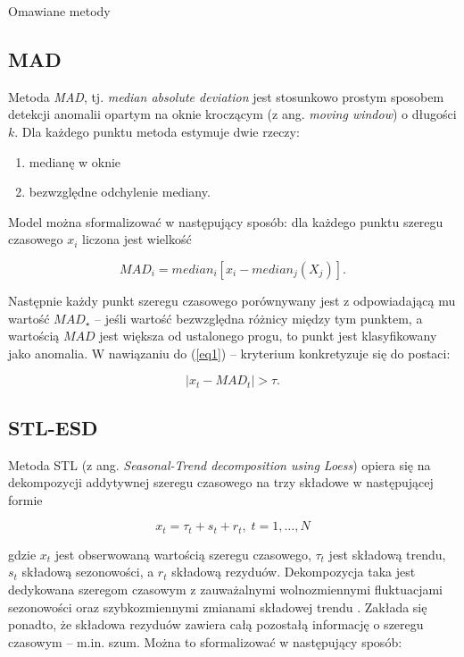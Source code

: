 \documentclass{article}
\begin{document}
Omawiane metody

\subsection{MAD}

Metoda \emph{MAD}, tj. \emph{median absolute deviation} jest stosunkowo
prostym sposobem detekcji anomalii opartym na oknie kroczącym (z ang.
\emph{moving window}) o długości \(k\). Dla każdego punktu metoda estymuje
dwie rzeczy:

\begin{enumerate}
\item
  medianę w oknie
\item
  bezwzględne odchylenie mediany.
\end{enumerate}


Model można sformalizować w następujący sposób:
dla każdego punktu szeregu czasowego \(x_{i}\) liczona jest wielkość

\begin{equation*}
MAD_{i} = median_{i}[x_{i} - median_{j}(X_{j})].
\end{equation*}

Następnie każdy punkt szeregu czasowego porównywany jest z odpowiadającą
mu wartość \(MAD_{\star}\) -- jeśli wartość bezwzględna różnicy między
tym punktem, a wartością \(MAD\) jest większa od ustalonego progu, to
punkt jest klasyfikowany jako anomalia. W nawiązaniu do (\ref{eq1}) -- kryterium
konkretyzuje się do postaci:

\begin{equation*}
|x_{t} - MAD_{t}| > \tau.
\end{equation*}

\hypertarget{stl-esd}{%
\subsection{STL-ESD}\label{stl-esd}}

Metoda STL (z ang. \emph{Seasonal-Trend decomposition using Loess})
opiera się na dekompozycji addytywnej szeregu czasowego na trzy składowe
w następującej formie

\begin{equation*}
x_{t} = \tau_{t} + s_{t} + r_{t},\; t = 1, \dots, N
\end{equation*}



gdzie \(x_{t}\) jest obserwowaną wartością szeregu czasowego,
\(\tau_{t}\) jest składową trendu, \(s_{t}\) składową sezonowości, a
\(r_{t}\) składową rezyduów. Dekompozycja taka jest dedykowana szeregom
czasowym z zauważalnymi wolnozmiennymi fluktuacjami sezonowości oraz
szybkozmiennymi zmianami składowej trendu \cite{wen-gao}. Zakłada się
ponadto, że składowa rezyduów zawiera całą pozostałą informację o
szeregu czasowym -- m.in. szum. Można to sformalizować w następujący
sposób:
\end{document}

